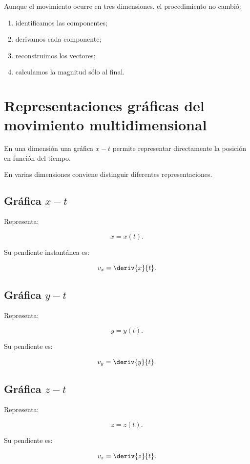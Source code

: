 \begin{interpretacion}
Aunque el movimiento ocurre en tres dimensiones, el procedimiento no cambió:

\begin{enumerate}
    \item identificamos las componentes;
    \item derivamos cada componente;
    \item reconstruimos los vectores;
    \item calculamos la magnitud sólo al final.
\end{enumerate}
\end{interpretacion}


\section{Representaciones gráficas del movimiento multidimensional}

En una dimensión una gráfica \(x-t\) permite representar directamente la
posición en función del tiempo.

En varias dimensiones conviene distinguir diferentes representaciones.


\subsection{Gráfica \(x-t\)}

Representa:

\[
x=x(t).
\]

Su pendiente instantánea es:

\[
v_x=\deriv{x}{t}.
\]


\subsection{Gráfica \(y-t\)}

Representa:

\[
y=y(t).
\]

Su pendiente es:

\[
v_y=\deriv{y}{t}.
\]


\subsection{Gráfica \(z-t\)}

Representa:

\[
z=z(t).
\]

Su pendiente es:

\[
v_z=\deriv{z}{t}.
\]


